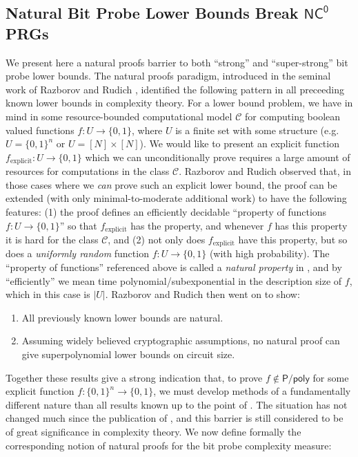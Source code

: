 \documentclass[11pt]{article}
\newcommand{\B}{\{0,1\}}
\begin{document}
\subsection{Natural Bit Probe Lower Bounds Break $\mathsf{NC^0}$ PRGs}\label{subsec:natural-vs-prg}
We present here a natural proofs barrier to both ``strong'' and ``super-strong'' bit probe lower bounds. The natural proofs paradigm, introduced in the seminal work of Razborov and Rudich \cite{natural-proofs}, identified the following pattern in all preceeding known lower bounds in complexity theory. For a lower bound problem, we have in mind in some resource-bounded computational model $\mathcal{C}$ for computing boolean valued functions $f: U\to \B$, where $U$ is a finite set with some structure (e.g. $U = \B^n$ or $U = [N] \times [N]$). We would like to present an explicit function $f_{\mathrm{explicit}}: U \to \B$ which we can unconditionally prove requires a large amount of resources for computations in the class $\mathcal{C}$. Razborov and Rudich observed that, in those cases where we \emph{can} prove such an explicit lower bound, the proof can be extended (with only minimal-to-moderate additional work) to have the following features: (1) the proof defines an efficiently decidable ``property of functions $f: U \to \B$'' so that $f_{\mathrm{explicit}}$ has the property, and whenever $f$ has this property it is hard for the class $\mathcal{C}$, and (2) not only does $f_{\mathrm{explicit}}$ have this property, but so does a \emph{uniformly random} function $f: U \to \B$ (with high probability). The ``property of functions'' referenced above is called a \emph{natural property} in \cite{natural-proofs}, and by ``efficiently'' we mean time polynomial/subexponential in the description size of $f$, which in this case is $|U|$. Razborov and Rudich then went on to show:
\begin{enumerate}
    \item All previously known lower bounds are natural.
    \item Assuming widely believed cryptographic assumptions, no natural proof can give superpolynomial lower bounds on circuit size.
\end{enumerate}
Together these results give a strong indication that, to prove $f \notin \mathsf{P/poly}$ for some explicit function $f: \B^n \to \B$, we must develop methods of a fundamentally different nature than all results known up to the point of \cite{natural-proofs}. The situation has not changed much since the publication of \cite{natural-proofs}, and this barrier is still considered to be of great significance in complexity theory. We now define formally the corresponding notion of natural proofs for the bit probe complexity measure:
\end{document}
